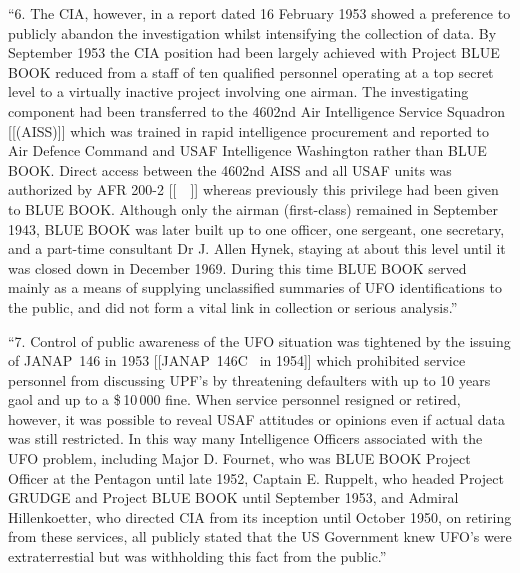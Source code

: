\begin{svgraybox}
``6. The CIA, however, in a report dated 16 February 1953 showed
a preference to publicly abandon the investigation whilst intensifying
the collection of data. By September 1953 the CIA position had been
largely achieved with Project BLUE BOOK reduced from a staff of ten
qualified personnel operating at a top secret level to a virtually
inactive project involving one airman. The investigating component
had been transferred to the 4602nd Air Intelligence Service Squadron [[(AISS)]]
which was trained in rapid intelligence procurement and reported to
Air Defence Command and USAF Intelligence Washington rather than
BLUE BOOK. Direct access between the 4602nd AISS and all USAF units
was authorized by AFR 200-2 [[~\cite{AFR200-2}~]] whereas previously this privilege had
been given to BLUE BOOK. Although only the airman (first-class)
remained in September 1943, BLUE BOOK was later built up to one
officer, one sergeant, one secretary, and a part-time consultant
Dr J. Allen Hynek, staying at about this level until it was closed
down in December 1969. During this time BLUE BOOK served mainly
as a means of supplying unclassified summaries of UFO identifications
to the public, and did not form a vital link in collection or
serious analysis.''

%
%
%
``7. Control of public awareness of the UFO situation was
tightened by the issuing of JANAP~146  in 1953
[[JANAP~146C~\cite{JANAP_146C} in 1954]]
which prohibited
service personnel from discussing UPF's by threatening defaulters
with up to 10 years gaol and up to a {\$}\,10\,000 fine. When service
personnel resigned or retired, however, it was possible to reveal
USAF attitudes or opinions even if actual data was still restricted.
In this way many Intelligence Officers associated with the UFO problem,
including Major D. Fournet, who was BLUE BOOK Project Officer at the
Pentagon until late 1952, Captain E. Ruppelt, who headed Project
GRUDGE and Project BLUE BOOK until September 1953, and Admiral
Hillenkoetter, who directed CIA from its inception until October 1950,
on retiring from these services, all publicly stated that the US
Government knew UFO's were extraterrestial but was withholding
this fact from the public.''


\end{svgraybox}
